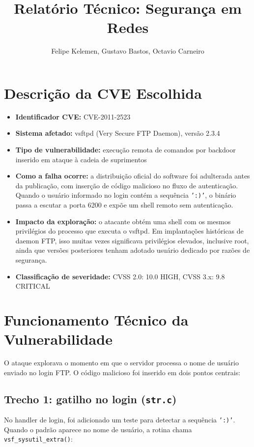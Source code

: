 \documentclass[12pt,a4paper]{article}
\title{Relatório Técnico: Segurança em Redes}
\author{Felipe Kelemen, Gustavo Bastos, Octavio Carneiro}
\date{\dataportugues}
\begin{document}
\maketitle

\section{Descrição da CVE Escolhida}
\begin{itemize}
	\item \textbf{Identificador CVE:} CVE-2011-2523
	\item \textbf{Sistema afetado:} vsftpd (Very Secure FTP Daemon), versão 2.3.4
	\item \textbf{Tipo de vulnerabilidade:} execução remota de comandos por backdoor inserido em ataque à cadeia de suprimentos
	\item \textbf{Como a falha ocorre:} a distribuição oficial do software foi adulterada antes da publicação, com inserção de código malicioso no fluxo de autenticação. Quando o usuário informado no login contém a sequência \texttt{':)'}, o binário passa a escutar a porta 6200 e expõe um shell remoto sem autenticação.
	\item \textbf{Impacto da exploração:} o atacante obtém uma shell com os mesmos privilégios do processo que executa o vsftpd. Em implantações históricas de daemon FTP, isso muitas vezes significava privilégios elevados, inclusive root, ainda que versões posteriores tenham adotado usuário dedicado por razões de segurança.
	\item \textbf{Classificação de severidade:} CVSS 2.0: 10.0 HIGH, CVSS 3.x: 9.8 CRITICAL
\end{itemize}

\section{Funcionamento Técnico da Vulnerabilidade}
O ataque explorava o momento em que o servidor processa o nome de usuário enviado no login FTP. O código malicioso foi inserido em dois pontos centrais:

\subsection{Trecho 1: gatilho no login (\texttt{str.c})}
No handler de login, foi adicionado um teste para detectar a sequência \texttt{':)'}. Quando o padrão aparece no nome de usuário, a rotina chama \texttt{vsf\_sysutil\_extra()}:
\end{document}
